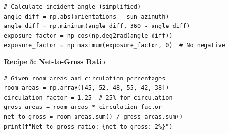 \begin{tcolorbox}[
    title=Copy-Paste Recipes,
    colframe=green,
    colback = white,
    arc=2mm
]
\begin{lstlisting}[basicstyle=\ttfamily\footnotesize,breaklines=true,columns=fullflexible,keepspaces=true,xleftmargin=0pt]
# Calculate incident angle (simplified)
angle_diff = np.abs(orientations - sun_azimuth)
angle_diff = np.minimum(angle_diff, 360 - angle_diff)
exposure_factor = np.cos(np.deg2rad(angle_diff))
exposure_factor = np.maximum(exposure_factor, 0)  # No negative

\end{lstlisting}

\textbf{Recipe 5: Net-to-Gross Ratio}
\begin{lstlisting}[basicstyle=\ttfamily\footnotesize,breaklines=true,columns=fullflexible,keepspaces=true,xleftmargin=0pt]
# Given room areas and circulation percentages
room_areas = np.array([45, 52, 48, 55, 42, 38])
circulation_factor = 1.25  # 25% for circulation
gross_areas = room_areas * circulation_factor
net_to_gross = room_areas.sum() / gross_areas.sum()
print(f"Net-to-gross ratio: {net_to_gross:.2%}")

\end{lstlisting}
\end{tcolorbox}


